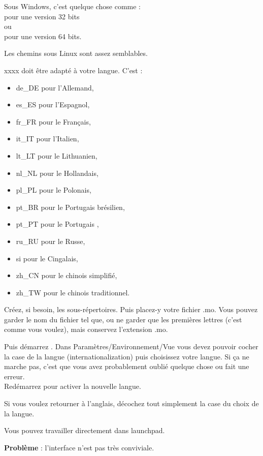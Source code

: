 Sous Windows, c'est quelque chose comme :\\
 pour une version 32 bits\\
 ou\\
 pour une version 64 bits.

Les chemins sous Linux sont assez semblables.

xxxx doit être adapté à votre langue. C'est :
\begin{itemize}
\item de\_DE pour l'Allemand,
\item es\_ES pour l'Espagnol,
\item fr\_FR pour le Français,
\item it\_IT pour l'Italien,
\item lt\_LT pour le Lithuanien,
\item nl\_NL pour le Hollandais,
\item pl\_PL pour le Polonais,
\item pt\_BR pour le Portugais brésilien,
\item pt\_PT pour le Portugais ,
\item ru\_RU pour le Russe,
\item si     pour le Cingalais,
\item zh\_CN pour le chinois simplifié,
\item zh\_TW pour le chinois traditionnel.
\end{itemize}

Créez, si besoin, les sous-répertoires. Puis placez-y votre fichier .mo. Vous pouvez garder le nom du fichier tel que, ou ne garder que les premières lettres (c'est comme vous voulez), mais conservez l'extension .mo.

Puis démarrez \codeblocks. Dans Paramètres/Environnement/Vue vous devez pouvoir cocher la case de la langue (internationalization) puis choisissez votre langue. Si ça ne marche pas, c'est que vous avez probablement oublié quelque chose ou fait une erreur.\\
Redémarrez \codeblocks pour activer la nouvelle langue.

Si vous voulez retourner à l'anglais, décochez tout simplement la case du choix de la langue.

Vous pouvez travailler directement dans launchpad.

\textbf{Problème} : l'interface n'est pas très conviviale.

